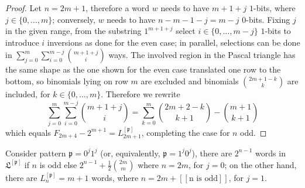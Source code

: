 \begin{proof}
Let $n=2m+1$, therefore a word $w$ needs to have $m+1+j$ $1$-bits, where $j\in
\lbrace 0,\ldots,m \rbrace$; conversely, $w$ needs to have $n-m-1-j=m-j$ $0$-bits.
Fixing $j$ in the given range, from the substring $1^{m+1+j}$ select
$i\in \lbrace 0,\ldots,m-j \rbrace$ $1$-bits  to introduce $i$ inversions as
done for the even case; in parallel, selections can be done in $
\sum_{j=0}^{m}{\sum_{i=0}^{m-j}{ {{m+1+j}\choose{i}}} } $ ways. The involved
region in the Pascal triangle has the same shape as the one shown for the even
case translated one row to the bottom, so binomials lying on row $m$ are
excluded and binomials ${ {2m+1-k}\choose{k} }$ are included, for $k\in \lbrace
0, \ldots, m \rbrace$.  Therefore we rewrite
\begin{displaymath}
    \sum_{j=0}^{m}{\sum_{i=0}^{m-j}{ {{m+1+j}\choose{i}}} }
    = \sum_{k=0}^{m}{{ {2m+2-k}\choose{k+1} }-{ {m+1}\choose{k+1} }}
\end{displaymath}
which equals $F_{2m+4}-2^{m+1} = L_{2m+1}^{[\mathfrak{p}]}$,
completing the case for $n$ odd.
\end{proof}

\begin{coro}
Consider pattern $\mathfrak{p}=0^{j}1^{j}$ (or, equivalently,
$\mathfrak{p}=1^{j}0^{j}$), there are $2^{n-1}$ words in
$\mathfrak{L}^{[\mathfrak{p}]}$ if $n$ is odd else $2^{n-1}
+\frac{1}{2}{{2m}\choose{m}}$ where $n=2m$, for $j=0$; on the other hand, there
are $L_{n}^{[\mathfrak{p}]} = m+1$ words, where $n=2m +  [\![\text{n is
odd}]\!]$, for $j=1$.
\end{coro}

